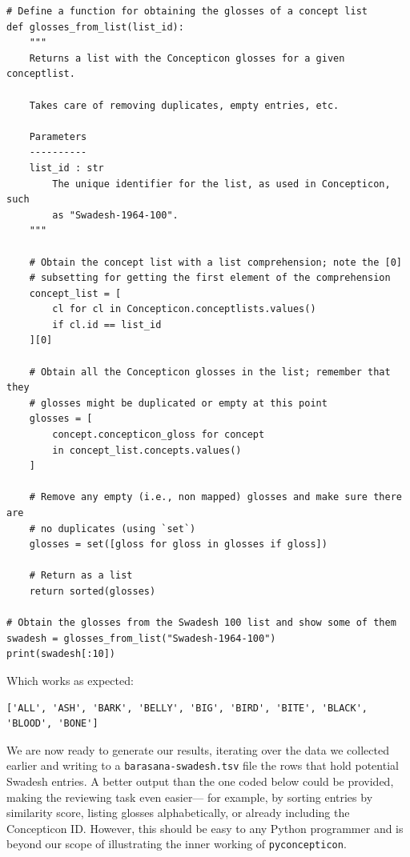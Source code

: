 \documentclass[
  a4paper,
  14pt,
  oneside,
  tablecaptionabove
]{scrbook}
\newcommand{\passthrough}[1]{#1}
\begin{document}
\begin{lstlisting}
# Define a function for obtaining the glosses of a concept list
def glosses_from_list(list_id):
    """
    Returns a list with the Concepticon glosses for a given conceptlist.

    Takes care of removing duplicates, empty entries, etc.

    Parameters
    ----------
    list_id : str
        The unique identifier for the list, as used in Concepticon, such
        as "Swadesh-1964-100".
    """

    # Obtain the concept list with a list comprehension; note the [0]
    # subsetting for getting the first element of the comprehension
    concept_list = [
        cl for cl in Concepticon.conceptlists.values()
        if cl.id == list_id
    ][0]

    # Obtain all the Concepticon glosses in the list; remember that they
    # glosses might be duplicated or empty at this point
    glosses = [
        concept.concepticon_gloss for concept
        in concept_list.concepts.values()
    ]

    # Remove any empty (i.e., non mapped) glosses and make sure there are
    # no duplicates (using `set`)
    glosses = set([gloss for gloss in glosses if gloss])

    # Return as a list
    return sorted(glosses)

# Obtain the glosses from the Swadesh 100 list and show some of them
swadesh = glosses_from_list("Swadesh-1964-100")
print(swadesh[:10])
\end{lstlisting}

Which works as expected:

\begin{lstlisting}
['ALL', 'ASH', 'BARK', 'BELLY', 'BIG', 'BIRD', 'BITE', 'BLACK', 'BLOOD', 'BONE']
\end{lstlisting}

We are now ready to generate our results, iterating over the data we
collected earlier and writing to a
\passthrough{\lstinline!barasana-swadesh.tsv!} file the rows that hold
potential Swadesh entries. A better output than the one coded below
could be provided, making the reviewing task even easier--- for example,
by sorting entries by similarity score, listing glosses alphabetically,
or already including the Concepticon ID. However, this should be easy to
any Python programmer and is beyond our scope of illustrating the inner
working of \passthrough{\lstinline!pyconcepticon!}.
\end{document}
